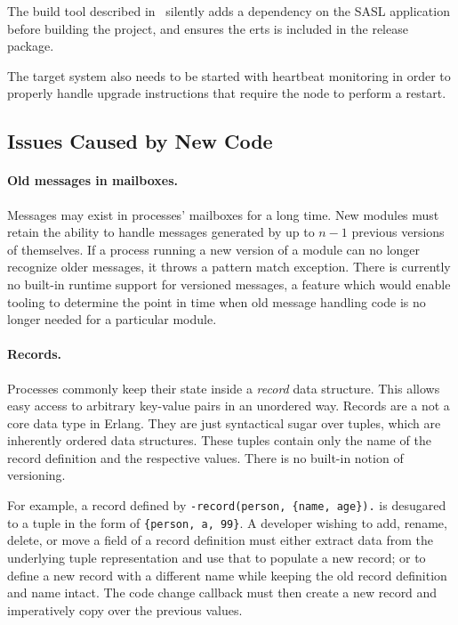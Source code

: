 The build tool described in~\cite{zak18} silently adds a dependency on the SASL application before building the project, and ensures the \acrshort{erts} is included in the release package.

The target system also needs to be started with heartbeat monitoring in order to properly handle upgrade instructions that require the node to perform a restart.~\cite{doc:otp}

\subsection{Issues Caused by New Code}

\paragraph{Old messages in mailboxes.}
Messages may exist in processes' mailboxes for a long time. New modules must retain the ability to handle messages generated by up to $n-1$ previous versions of themselves. If a process running a new version of a module can no longer recognize older messages, it throws a pattern match exception. There is currently no built-in runtime support for versioned messages, a feature which would enable tooling to determine the point in time when old message handling code is no longer needed for a particular module.

\paragraph{Records.}
Processes commonly keep their state inside a \emph{record} data structure. This allows easy access to arbitrary key-value pairs in an unordered way. Records are a not a core data type in Erlang. They are just syntactical sugar over tuples, which are inherently ordered data structures. These tuples contain only the name of the record definition and the respective values. There is no built-in notion of versioning.

For example, a record defined by \lstinline|-record(person, {name, age}).| is desugared to a tuple in the form of \lstinline|{person, a, 99}|. A developer wishing to add, rename, delete, or move a field of a record definition must either extract data from the underlying tuple representation and use that to populate a new record; or to define a new record with a different name while keeping the old record definition and name intact. The code change callback must then create a new record and imperatively copy over the previous values.

